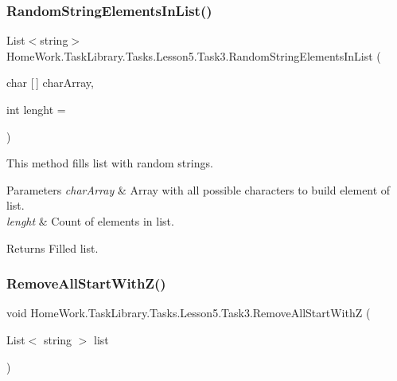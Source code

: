 \subsubsection{\texorpdfstring{RandomStringElementsInList()}{RandomStringElementsInList()}}
{\footnotesize\ttfamily List$<$string$>$ Home\+Work.\+Task\+Library.\+Tasks.\+Lesson5.\+Task3.\+Random\+String\+Elements\+In\+List (\begin{DoxyParamCaption}\item[{char \mbox{[}$\,$\mbox{]}}]{char\+Array,  }\item[{int}]{lenght = {} }\end{DoxyParamCaption})\hspace{0.3cm}{\ttfamily [private]}}



This method fills list with random strings. 


\begin{DoxyParams}{Parameters}
{\em char\+Array} & Array with all possible characters to build element of list.\\
\hline
{\em lenght} & Count of elements in list.\\
\hline
\end{DoxyParams}
\begin{DoxyReturn}{Returns}
Filled list.
\end{DoxyReturn}
\mbox{\label{class_home_work_1_1_task_library_1_1_tasks_1_1_lesson5_1_1_task3_afb2f1efe2dfbd4558fb0d5b7426cff6a}} 
\subsubsection{\texorpdfstring{RemoveAllStartWithZ()}{RemoveAllStartWithZ()}}
{\footnotesize\ttfamily void Home\+Work.\+Task\+Library.\+Tasks.\+Lesson5.\+Task3.\+Remove\+All\+Start\+WithZ (\begin{DoxyParamCaption}\item[{List$<$ string $>$}]{list }\end{DoxyParamCaption})\hspace{0.3cm}{\ttfamily [private]}}



